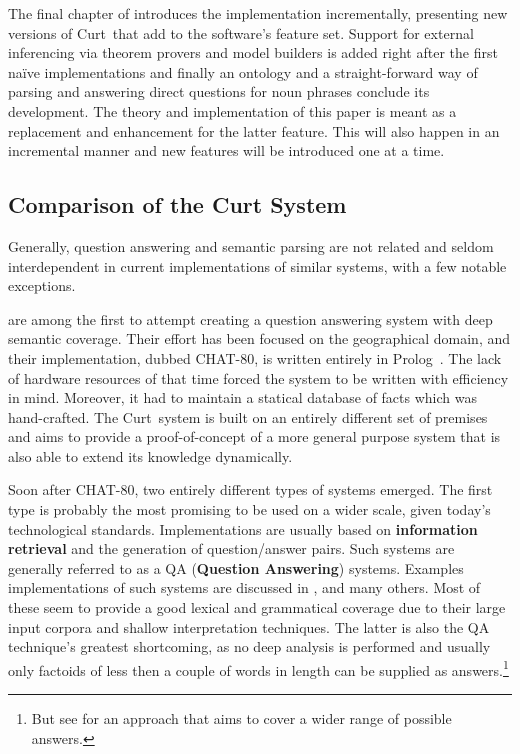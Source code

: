 \documentclass[12pt,a4paper]{article}
\newcommand{\abbr}{\textsf} %
\newcommand{\term}[1]{\textsf{\textbf{#1}}} %
\newcommand{\pn}{\textsf} %
\newcommand{\curt}{\pn{Curt}\mbox{ }}
\newcommand{\prol}{\pn{Prolog}\mbox{ }}
\theoremstyle{remark} \newtheorem*{termin}{Terminology} %
\begin{document}
The final chapter of \cite{blackburnbos:cl1} introduces the implementation
incrementally, presenting new versions of \curt that add to the software's
feature set. Support for external inferencing via theorem provers and model
builders is added right after the first naïve implementations and
finally an ontology and a straight-forward way of parsing and answering direct
questions for noun phrases conclude its development. The theory and
implementation of this paper is meant as a replacement and enhancement for the
latter feature. This will also happen in an incremental manner and new features
will be introduced one at a time.

\subsection{Comparison of the Curt System}\label{sec:comparison}

Generally, question answering and semantic parsing are not related and seldom
interdependent in current implementations of similar systems, with a few notable
exceptions.

\cite{chat} are among  the first to attempt creating a question answering system
with deep semantic coverage. Their effort has been focused on the geographical
domain, and their implementation, dubbed \pn{CHAT-80}, is written entirely in
\prol. The lack of hardware resources of that time forced the system to be
written with efficiency in mind. Moreover, it had to maintain a statical
database of facts which was hand-crafted. The \curt system is built on  an
entirely different set of premises and aims to provide a proof-of-concept of a
more general purpose system that is also able to extend its knowledge
dynamically.

Soon after \pn{CHAT-80}, two entirely different types of systems emerged. The
first type is probably the most promising to be used on a wider scale, given
today's technological standards. Implementations are usually based on
\term{information retrieval} and the generation of question/answer pairs. Such
systems are generally referred to as a \abbr{QA} (\term{Question Answering})
systems.  Examples implementations of such systems are discussed in \cite{rama},
\cite{iesqa} and many others. Most of these seem to provide a good lexical and
grammatical coverage due to their large input corpora and
shallow interpretation techniques. The latter is also the \abbr{QA} technique's
greatest shortcoming, as no deep analysis is  performed and usually
only factoids of less then a couple of words in length can be supplied as
answers.\footnote{But see \cite{aqabtf} for an approach that aims to cover a
wider range of possible answers.}
\end{document}
